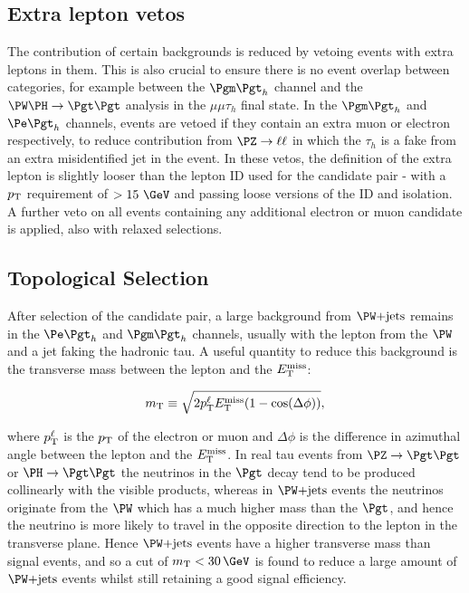 \subsection{Extra lepton vetos}

The contribution of certain backgrounds is reduced by vetoing events with extra
leptons in them. This is also crucial to ensure there is no event overlap
between categories, for example between the $\mutau$ channel and the
$\PW\PH\to\Pgt\Pgt$ analysis in the $\mu\mu\tau_{h}$ final state. In the
$\mutau$ and $\etau$ channels, events are vetoed if they contain an extra muon
or electron respectively, to reduce contribution from $\PZ\to\ell\ell$ in which
the $\tau_{h}$ is a fake from an extra misidentified jet in the event. In these
vetos, the definition of the extra lepton is slightly looser than the lepton ID
used for the candidate pair - with a $p_{\mathrm{T}}$ requirement of $> 15~\GeV$ and
passing loose versions of the ID and isolation. A further veto on all events
containing any additional electron or muon candidate is applied, also with
relaxed selections. 

\subsection{Topological Selection}
\label{sec:topologicalselection}

After selection of the candidate pair, a large background from $\WJets$ remains
in the $\etau$ and $\mutau$ channels, usually with the lepton from the $\PW$ and
a jet faking the hadronic tau. A useful quantity to reduce this background is
the transverse mass between the lepton and the $E_{\mathrm{T}}^{\text{miss}}$:

\begin{equation}
m_{\text{T}}\equiv\sqrt{2p_{\mathrm{T}}^{\ell}E_{\mathrm{T}}^{\text{miss}}(1-\cos(\Delta\phi))},
\end{equation}

where $p_{\mathrm{T}}^{\ell}$ is the $p_{\mathrm{T}}$ of the electron or muon and $\Delta\phi$ is the
difference in azimuthal angle between the lepton and the $E_{\mathrm{T}}^{\text{miss}}$. In real tau
events from $\PZ\to\Pgt\Pgt$ or $\PH\to\Pgt\Pgt$ the neutrinos in the $\Pgt$
decay tend to be produced collinearly with the visible products, whereas in
$\WJets$ events the neutrinos originate from the $\PW$ which has a much higher
mass than the $\Pgt$, and hence the neutrino is more likely to travel in the
opposite direction to the lepton in the transverse plane. Hence $\WJets$ events
have a higher transverse mass than signal events, and so a cut of
$m_{\text{T}}<30\,\GeV$ is found to reduce a large amount of $\WJets$ events
whilst still retaining a good signal efficiency.

